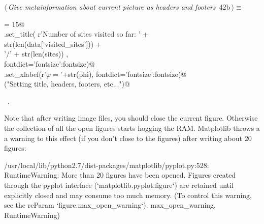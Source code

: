 \documentclass[11.5pt]{report}
\newenvironment{CVerbatim}
 {\singlespacing\center\BVerbatim}
 {\endBVerbatim\endcenter}
\begin{document}
\begin{flushleft} \small\label{scrap59}\raggedright\small
{} $\langle\,${\itshape Give metainformation about current picture as headers and footers}\nobreak\ {\footnotesize {42b}}$\,\rangle\equiv$
\vspace{-1ex}
\begin{list}{}{} \item
\mbox{}\verb@fontsize = 15@\\
\mbox{}\verb@ax.set_title( r'Number of sites visited so far: ' +\@\\
\mbox{}\verb@               str(len(data['visited_sites']))   +\@\\
\mbox{}\verb@               '/' + str(len(sites))           ,  \@\\
\mbox{}\verb@                    fontdict={'fontsize':fontsize})@\\
\mbox{}\verb@ax.set_xlabel(r'$\varphi=$'+str(phi), fontdict={'fontsize':fontsize})@\\
\mbox{}\verb@debug("Setting title, headers, footers, etc...")@\\
\mbox{}\verb@@{\NWsep}
\end{list}
\vspace{-1.5ex}
\footnotesize
\begin{list}{}{\setlength{\itemsep}{-\parsep}\setlength{\itemindent}{-\leftmargin}}
\item \NWtxtMacroRefIn\ .

\item{}
\end{list}
\vspace{4ex}
\end{flushleft}

\vspace{-0.8cm}
Note that after writing image files, you should close the current figure. Otherwise
the collection of all the open figures starts hogging the RAM. Matplotlib throws a
a warning to this effect (if you don't close to the figures) after writing about 
20 figures:

\begin{CVerbatim}[fontsize=\small]
/usr/local/lib/python2.7/dist-packages/matplotlib/pyplot.py:528: RuntimeWarning: 
More than 20 figures have been opened. Figures created through the pyplot interface 
(`matplotlib.pyplot.figure`) are retained until explicitly closed and may consume 
too much memory. (To control this warning, see the rcParam `figure.max_open_warning`).
max_open_warning, RuntimeWarning)
\end{CVerbatim}
\end{document}

